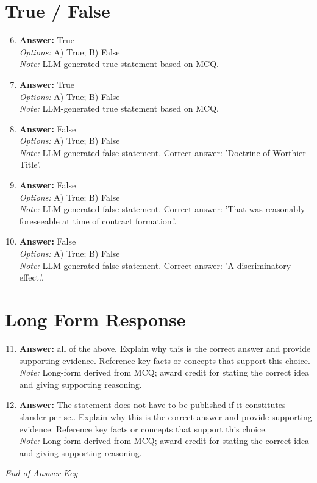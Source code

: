 \documentclass[12pt]{article}
\begin{document}
\section*{True / False}
\begin{enumerate}[label=\arabic*.]
\setcounter{enumi}{5}
\item \textbf{Answer:} True
\\ \textit{Options:} A) True; B) False
\\ \textit{Note:} LLM-generated true statement based on MCQ.
\item \textbf{Answer:} True
\\ \textit{Options:} A) True; B) False
\\ \textit{Note:} LLM-generated true statement based on MCQ.
\item \textbf{Answer:} False
\\ \textit{Options:} A) True; B) False
\\ \textit{Note:} LLM-generated false statement. Correct answer: 'Doctrine of Worthier Title'.
\item \textbf{Answer:} False
\\ \textit{Options:} A) True; B) False
\\ \textit{Note:} LLM-generated false statement. Correct answer: 'That was reasonably foreseeable at time of contract formation.'.
\item \textbf{Answer:} False
\\ \textit{Options:} A) True; B) False
\\ \textit{Note:} LLM-generated false statement. Correct answer: 'A discriminatory effect.'.
\end{enumerate}

\section*{Long Form Response}
\begin{enumerate}[label=\arabic*.]
\setcounter{enumi}{10}
\item \textbf{Answer:} all of the above. Explain why this is the correct answer and provide supporting evidence. Reference key facts or concepts that support this choice.
\\ \textit{Note:} Long-form derived from MCQ; award credit for stating the correct idea and giving supporting reasoning.
\item \textbf{Answer:} The statement does not have to be published if it constitutes slander per se.. Explain why this is the correct answer and provide supporting evidence. Reference key facts or concepts that support this choice.
\\ \textit{Note:} Long-form derived from MCQ; award credit for stating the correct idea and giving supporting reasoning.
\end{enumerate}

\vfill
\noindent\textit{End of Answer Key}
\end{document}
